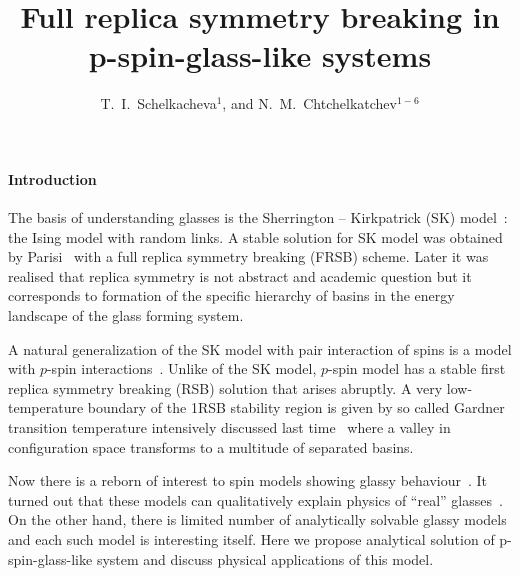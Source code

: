 \documentclass{jetpl}
\title{Full replica symmetry breaking in p-spin-glass-like  systems }
\author{T.~I.~Schelkacheva$^{1}$, and N.~M.~Chtchelkatchev$^{1-6}$}
\begin{document}
\maketitle
\paragraph*{Introduction\label{Sec:Intro}}




 The basis of understanding glasses  is the Sherrington -- Kirkpatrick (SK) model~\cite{sk}: the
Ising model with random links. A stable solution for SK model  was obtained by Parisi~\cite{par1,book} with a full replica symmetry breaking (FRSB) scheme. Later it was realised that replica symmetry is not abstract and academic question but it corresponds to formation of the specific hierarchy of basins in the energy landscape of the glass forming system.

A natural generalization of the SK model with pair interaction of spins is a model with $p$-spin interactions~\cite{book,Gardner}. Unlike of the SK model, $p$-spin model has a stable first replica symmetry breaking (RSB) solution that arises abruptly. A very low-temperature boundary of the 1RSB stability region is given by so called Gardner transition temperature intensively discussed last time~\cite{Gardner,F.Zamponi} where a valley in configuration space transforms to a multitude of separated basins.

Now there is a reborn of interest to spin models showing glassy behaviour~\cite{F.Zamponi,Cris,Kirk,Kirkp,Franz,F.Caltagirone,Riz,Rizzo,Par,B}. It turned out that these models can qualitatively explain physics of ``real'' glasses~\cite{Wolynes}. On the other hand, there is limited number of analytically solvable glassy models and each such model is interesting itself. Here we propose analytical solution of p-spin-glass-like  system and discuss physical applications of this model.


\end{document}
